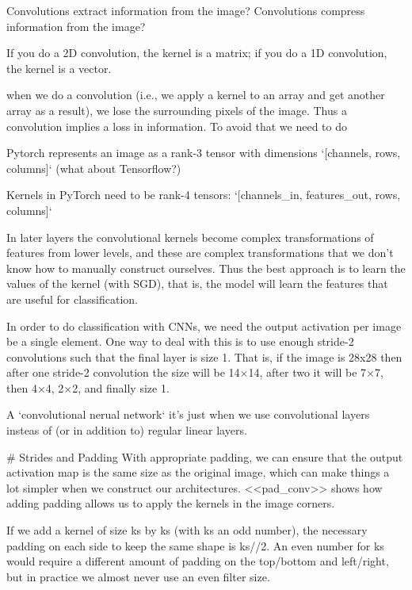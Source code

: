 Convolutions extract information from the image?
Convolutions compress information from the image?

If you do a 2D convolution, the kernel is a matrix; if you do a 1D convolution, the kernel is a vector. 


when we do a convolution (i.e., we apply a kernel to an array and get another array as a result), we lose the surrounding pixels
of the image. Thus a convolution implies a loss in information. To avoid that we need to do 



Pytorch represents an image as a rank-3 tensor with dimensions `[channels, rows, columns]` (what about Tensorflow?)


Kernels in PyTorch need to be rank-4 tensors: 
`[channels_in, features_out, rows, columns]`


In later layers the convolutional kernels become complex transformations of features from lower 
levels, and these are complex transformations that we don't know how to manually construct ourselves.
Thus the best approach is to learn the values of the kernel (with SGD), that is, the model will learn
the features that are useful for classification. 


In order to do classification with CNNs, we need the output activation per image be a single element. 
One way to deal with this is to use enough stride-2 convolutions such that the final layer is size 1. 
That is, if the image is 28x28 then after one stride-2 convolution the size will be 14×14, after two 
it will be 7×7, then 4×4, 2×2, and finally size 1.




A `convolutional nerual network` it's just when we use convolutional layers insteas of (or in addition to) 
regular linear layers. 



# Strides and Padding
With appropriate padding, we can ensure that the output activation map is the same size as the original image, 
which can make things a lot simpler when we construct our architectures. <<pad_conv>> shows how adding padding 
allows us to apply the kernels in the image corners.

If we add a kernel of size ks by ks (with ks an odd number), the necessary padding on each side to keep the 
same shape is ks//2. An even number for ks would require a different amount of padding on the top/bottom 
and left/right, but in practice we almost never use an even filter size.

